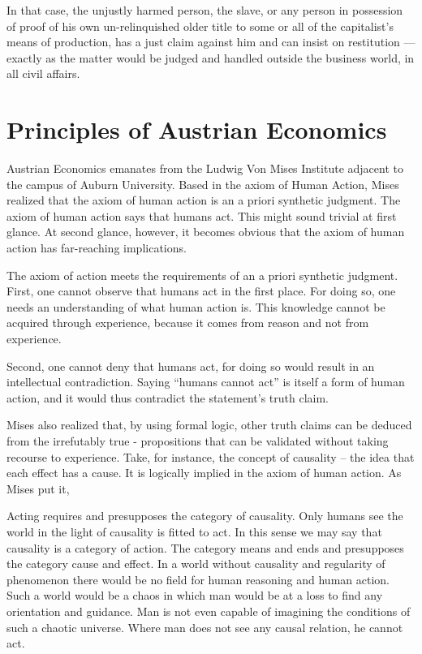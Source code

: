 In that case, the unjustly harmed person, the slave, or any person in possession of proof of his own un-relinquished older title to some or all of the capitalist’s means of production, has a just claim against him and can insist on restitution — exactly as the matter would be judged and handled outside the business world, in all civil affairs.


\section{Principles of Austrian Economics}

Austrian Economics emanates from the Ludwig Von Mises Institute adjacent to the campus of Auburn University. Based in the axiom of Human Action, Mises realized that the axiom of human action is an a priori synthetic judgment. The axiom of human action says that humans act. This might sound trivial at first glance. At second glance, however, it becomes obvious that the axiom of human action has far-reaching implications.

The axiom of action meets the requirements of an a priori synthetic judgment. First, one cannot observe that humans act in the first place. For doing so, one needs an understanding of what human action is. This knowledge cannot be acquired through experience, because it comes from reason and not from experience.

Second, one cannot deny that humans act, for doing so would result in an intellectual contradiction. Saying ``humans cannot act'' is itself a form of human action, and it would thus contradict the statement’s truth claim.

Mises also realized that, by using formal logic, other truth claims can be deduced from the irrefutably true - propositions that can be validated without taking recourse to experience. Take, for instance, the concept of causality – the idea that each effect has a cause. It is logically implied in the axiom of human action. As Mises put it,

Acting requires and presupposes the category of causality. Only humans see the world in the light of causality is fitted to act. In this sense we may say that causality is a category of action. The category means and ends and presupposes the category cause and effect. In a world without causality and regularity of phenomenon there would be no field for human reasoning and human action. Such a world would be a chaos in which man would be at a loss to find any orientation and guidance. Man is not even capable of imagining the conditions of such a chaotic universe. Where man does not see any causal relation, he cannot act.

